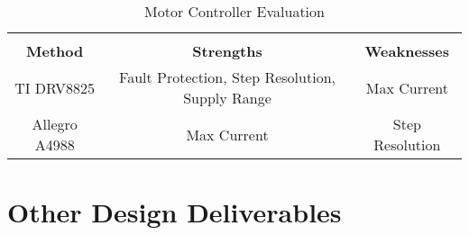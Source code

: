 \begin{table}[ht]
	\caption{Motor Controller Evaluation}
	\label{table:MCEval}
	\centering
	\begin{tabular}{c c c}
	\hline \hline \\
		\textbf{Method} & \textbf{Strengths} & \textbf{Weaknesses}\\
		TI DRV8825 & Fault Protection, Step Resolution, Supply Range & Max Current\\
		Allegro A4988 & Max Current & Step Resolution\\
	\end{tabular}
\end{table}


\section{Other Design Deliverables}